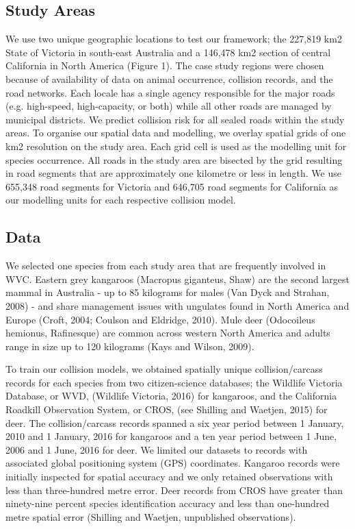 \subsection{Study Areas}

We use two unique geographic locations to test our framework; the 227,819 km2 State of Victoria in south-east Australia and a 146,478 km2 section of central California in North America (Figure 1). The case study regions were chosen because of availability of data on animal occurrence, collision records, and the road networks. Each locale has a single agency responsible for the major roads (e.g. high-speed, high-capacity, or both) while all other roads are managed by municipal districts. We predict collision risk for all sealed roads within the study areas. To organise our spatial data and modelling, we overlay spatial grids of one km2 resolution on the study area. Each grid cell is used as the modelling unit for species occurrence. All roads in the study area are bisected by the grid resulting in road segments that are approximately one kilometre or less in length. We use 655,348 road segments for Victoria and 646,705 road segments for California as our modelling units for each respective collision model.

\subsection{Data}

We selected one species from each study area that are frequently involved in WVC. Eastern grey kangaroos (Macropus giganteus, Shaw) are the second largest mammal in Australia - up to 85 kilograms for males (Van Dyck and Strahan, 2008) - and share management issues with ungulates found in North America and Europe (Croft, 2004; Coulson and Eldridge, 2010).  Mule deer (Odocoileus hemionus, Rafinesque) are common across western North America and adults range in size up to 120 kilograms (Kays and Wilson, 2009).

To train our collision models, we obtained spatially unique collision/carcass records for each species from two citizen-science databases; the Wildlife Victoria Database, or WVD, (Wildlife Victoria, 2016) for kangaroos, and the California Roadkill Observation System, or CROS, (see Shilling and Waetjen, 2015) for deer.  The collision/carcass records spanned a six year period between 1 January, 2010 and 1 January, 2016 for kangaroos and a ten year period between 1 June, 2006 and 1 June, 2016 for deer. We limited our datasets to records with associated global positioning system (GPS) coordinates. Kangaroo records were initially inspected for spatial accuracy and we only retained observations with less than three-hundred metre error. Deer records from CROS have greater than ninety-nine percent species identification accuracy and less than one-hundred metre spatial error (Shilling and Waetjen, unpublished observations).

